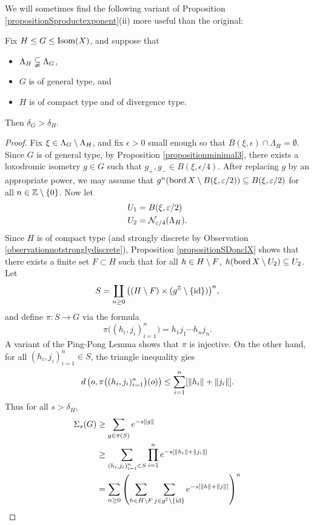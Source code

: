 We will sometimes find the following variant of Proposition \ref{propositionSproductexponent}(ii) more useful than the original:

\begin{proposition}
\label{propositiondeltagtrdeltap}
Fix $H\leq G\leq\Isom(X)$, and suppose that
\begin{itemize}
\item[(I)] $\Lambda_H \propersubset \Lambda_G$,
\item[(II)] $G$ is of general type, and
\item[(III)] $H$ is of compact type and of divergence type.
\end{itemize}
Then $\delta_G > \delta_H$.
\end{proposition}
\begin{proof}
Fix $\xi\in\Lambda_G\butnot\Lambda_H$, and fix $\epsilon > 0$ small enough so that $B(\xi,\epsilon)\cap\Lambda_H = \emptyset$. Since $G$ is of general type, by Proposition \ref{propositionminimal3}, there exists a loxodromic isometry $g\in G$ such that $g_+,g_-\in B(\xi,\epsilon/4)$. After replacing $g$ by an appropriate power, we may assume that $g^n(\bord X\butnot B(\xi,\epsilon/2)) \subset B(\xi,\epsilon/2)$ for all $n\in\Z\butnot\{0\}$. Now let
\begin{align*}
U_1 &= B(\xi,\epsilon/2)\\
U_2 &= \thick{\Lambda_H}{\epsilon/4}.
\end{align*}
Since $H$ is of compact type (and strongly discrete by Observation \ref{observationnotstronglydiscrete}), Proposition \ref{propositionSDonclX} shows that there exists a finite set $F\subset H$ such that for all $h\in H\butnot F$, $h(\bord X\butnot U_2)\subset U_2$. Let
\[
S = \coprod_{n\geq 0} \big((H\butnot F)\times(g^\Z\butnot\{\id\})\big)^n,
\]
and define $\pi:S\to G$ via the formula
\[
\pi\big((h_i,j_i)_{i = 1}^n\big) = h_1 j_1 \cdots h_n j_n.
\]
A variant of the Ping-Pong Lemma shows that $\pi$ is injective. On the other hand, for all $(h_i,j_i)_{i = 1}^n\in S$, the triangle inequality gies
\[
\dist\left(\zero,\pi\big((h_i,j_i)_{i = 1}^n\big)(\zero)\right) \leq \sum_{i = 1}^n [\dogo{h_i} + \dogo{j_i}].
\]
Thus for all $s > \delta_H$,
\begin{align*}
\Sigma_s(G) &\geq \sum_{g\in \pi(S)} e^{-s\dogo g}\\
&\geq \sum_{(h_i,j_i)_{i = 1}^n \in S} \prod_{i = 1}^n e^{-s[\dogo{h_i} + \dogo{j_i}]}\\
&= \sum_{n\geq 0} \left(\sum_{h\in H\butnot F}\sum_{j\in g^\Z\butnot\{\id\}} e^{-s[\dogo h + \dogo j]}\right)^n\\

\end{align*}
\end{proof}
